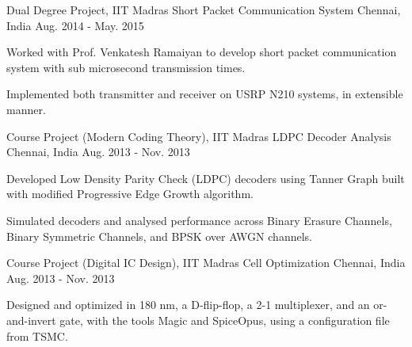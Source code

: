 \begin{cventries}
	\cventry
	{Dual Degree Project, IIT Madras}
	{Short Packet Communication System}
	{Chennai, India}
	{Aug. 2014 - May. 2015}
	{
		\begin{cvitems}
			\item{Worked with Prof. Venkatesh Ramaiyan to develop short packet communication system with sub microsecond transmission times.}
			\item{Implemented both transmitter and receiver on USRP N210 systems, in extensible manner.}
		\end{cvitems}
	}

	\cventry
	{Course Project (Modern Coding Theory), IIT Madras}
	{LDPC Decoder Analysis}
	{Chennai, India}
	{Aug. 2013 - Nov. 2013}
	{
		\begin{cvitems}
			\item{Developed Low Density Parity Check (LDPC) decoders using Tanner Graph built with modified Progressive Edge Growth algorithm.}
			\item{Simulated decoders and analysed performance across Binary Erasure Channels, Binary Symmetric Channels, and BPSK over AWGN channels.}
		\end{cvitems}
	}

	\cventry
	{Course Project (Digital IC Design), IIT Madras}
	{Cell Optimization}
	{Chennai, India}
	{Aug. 2013 - Nov. 2013}
	{
		\begin{cvitems}
			\item{Designed and optimized in 180 nm, a D-flip-flop, a 2-1 multiplexer, and an or-and-invert gate, with the tools Magic and SpiceOpus, using a configuration file from TSMC.}
		\end{cvitems}
	}

\end{cventries}
